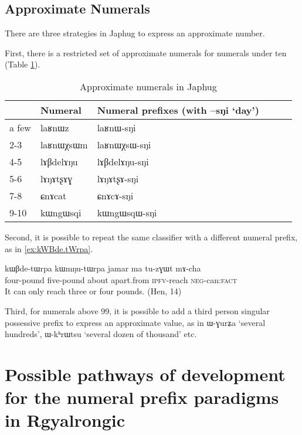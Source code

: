\documentclass[oldfontcommands,oneside,a4paper,12pt]{article}
\newcommand{\ipa}[1]{{\phon#1}}
\begin{document}
 \subsection{Approximate Numerals}
There are three strategies in Japhug to express an approximate number.

First, there is a restricted set of approximate numerals for numerals under ten (Table \ref{tab:approx.num}).

\begin{table}[H]
\caption{Approximate numerals in Japhug} \label{tab:approx.num} \centering
\begin{tabular}{llllll}
\toprule
&Numeral &Numeral prefixes (with \ipa{--sŋi} `day')\\
\midrule
a few &\ipa{laʁnɯz}  & 	\ipa{laʁnɯ-sŋi}  & 	\\	
2-3&\ipa{laʁnɯχsɯm}  & 	\ipa{laʁnɯχsɯ-sŋi}  & 	\\	
4-5&\ipa{lɤβdelɤŋu}  & 	\ipa{lɤβdelɤŋu-sŋi}  & 	\\	
5-6&\ipa{lɤŋɤtʂɤɣ}  & 	\ipa{lɤŋɤtʂɤ-sŋi}  & 	\\	
7-8&\ipa{ɕnɤcat}  & 	\ipa{ɕnɤcɤ-sŋi }  & 	\\	
9-10&\ipa{kɯngɯsqi}  & 	\ipa{kɯngɯsqɯ-sŋi}  & 	\\	
\bottomrule
\end{tabular}
\end{table}

Second, it is possible to repeat the same classifier with a different numeral prefix, as in \ref{ex:kWBde.tWrpa}.
 
 
 \begin{exe}
\ex \label{ex:kWBde.tWrpa}
\gll 
\ipa{kɯβde-tɯrpa} 	\ipa{kɯmŋu-tɯrpa} 	\ipa{jamar} 	\ipa{ma} 	\ipa{tu-zɣɯt} 	\ipa{mɤ-cha} \\
four-pound five-pound about apart.from \textsc{ipfv}-reach \textsc{neg}-can:\textsc{fact} \\
\glt It can only reach three or four pounds. (Hen, 14)
\end{exe}


Third, for numerals above 99, it is possible to add a third person singular possessive prefix to  express an approximate value, as in  \ipa{ɯ-ɣurʑa} `several hundreds', \ipa{ɯ-kʰrɯtsu} `several dozen of thousand' etc.


\section{Possible pathways of development for the numeral prefix paradigms  in Rgyalrongic }
\end{document}
